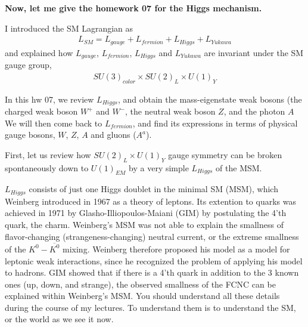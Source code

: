 \documentclass[12pt]{article}
\begin{document}
{\bf Now, let me give the homework 07 for the Higgs mechanism.}

  I introduced the SM Lagrangian as
  \begin{eqnarray}
    L_{SM} = L_{gauge} + L_{fermion} + L_{Higgs} + L_{Yukawa} \label{eq.7SM}
  \end{eqnarray}
    and explained how $L_{gauge}$, $L_{fermion}$, $L_{Higgs}$ and $L_{Yukawa}$
  are invariant under the SM gauge group,
\begin{eqnarray}
  SU(3)_{color} \times SU(2)_L \times U(1)_Y \label{eq.7G}
\end{eqnarray}
  
  In this hw 07, we review $L_{Higgs}$, and
  obtain the mass-eigenstate weak bosons (the charged weak
  boson $W^+$ and $W^-$, the neutral weak boson $Z$, and the photon $A$
  We will then come back to $L_{fermion}$, and find its expressions
  in terms of physical gauge bosons, $W$, $Z$, $A$ and gluons ($A^a$).

  First, let us review how $SU(2)_L \times U(1)_Y$ gauge
  symmetry can be broken spontaneously down to $U(1)_{EM}$
  by a very simple $L_{Higgs}$ of the MSM.

  $L_{Higgs}$ consists of just one Higgs doublet in the
  minimal SM (MSM), which Weinberg introduced in 1967
  as a theory of leptons.  Its extention to quarks
  was achieved in 1971 by Glasho-Illiopoulos-Maiani (GIM)
  by postulating the 4'th quark, the charm.  Weinberg's
  MSM was not able to explain the smallness of
  flavor-changing (strangeness-changing) neutral current,
  or the extreme smallness of the $K^0-\overline{K^0}$ mixing.
  Weinberg therefore proposed his model as a model for
  leptonic weak interactions, since he recognized the problem
  of applying his model to hadrons.  GIM showed that
  if there is a 4'th quark in addition to the 3 known
  ones (up, down, and strange), the observed smallness
  of the FCNC can be explained within Weinberg's MSM.
  You should understand all these details during the
  course of my lectures.  To understand them is to
  understand the SM, or the world as we see it now.
\end{document}
